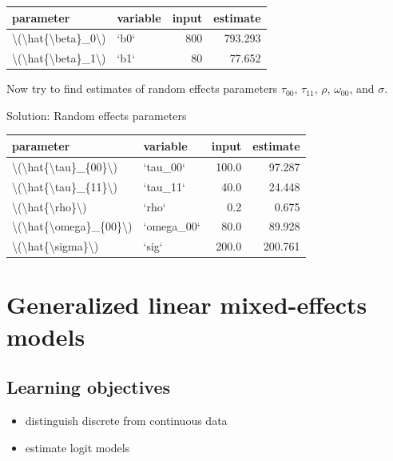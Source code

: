 \documentclass[]{book}
\providecommand{\tightlist}{%
  \setlength{\itemsep}{0pt}\setlength{\parskip}{0pt}}
\begin{document}
\begin{tabular}{l|l|r|r}
\hline
parameter & variable & input & estimate\\
\hline
\textbackslash{}(\textbackslash{}hat\{\textbackslash{}beta\}\_0\textbackslash{}) & `b0` & 800 & 793.293\\
\hline
\textbackslash{}(\textbackslash{}hat\{\textbackslash{}beta\}\_1\textbackslash{}) & `b1` & 80 & 77.652\\
\hline
\end{tabular}

Now try to find estimates of random effects parameters \(\tau_{00}\), \(\tau_{11}\), \(\rho\), \(\omega_{00}\), and \(\sigma\).

Solution: Random effects parameters

\begin{tabular}{l|l|r|r}
\hline
parameter & variable & input & estimate\\
\hline
\textbackslash{}(\textbackslash{}hat\{\textbackslash{}tau\}\_\{00\}\textbackslash{}) & `tau\_00` & 100.0 & 97.287\\
\hline
\textbackslash{}(\textbackslash{}hat\{\textbackslash{}tau\}\_\{11\}\textbackslash{}) & `tau\_11` & 40.0 & 24.448\\
\hline
\textbackslash{}(\textbackslash{}hat\{\textbackslash{}rho\}\textbackslash{}) & `rho` & 0.2 & 0.675\\
\hline
\textbackslash{}(\textbackslash{}hat\{\textbackslash{}omega\}\_\{00\}\textbackslash{}) & `omega\_00` & 80.0 & 89.928\\
\hline
\textbackslash{}(\textbackslash{}hat\{\textbackslash{}sigma\}\textbackslash{}) & `sig` & 200.0 & 200.761\\
\hline
\end{tabular}

\hypertarget{generalized-linear-mixed-effects-models}{%
\chapter{Generalized linear mixed-effects models}\label{generalized-linear-mixed-effects-models}}

\hypertarget{learning-objectives}{%
\section{Learning objectives}\label{learning-objectives}}

\begin{itemize}
\tightlist
\item
  distinguish discrete from continuous data
\item
  estimate logit models
\end{itemize}
\end{document}
